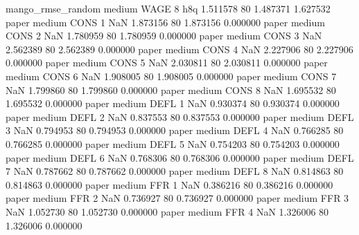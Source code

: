 mango_rmse_random     medium     WAGE                 8                  h8q  1.511578 80       1.487371           1.627532
            paper     medium     CONS                 1                  NaN  1.873156 80       1.873156           0.000000
            paper     medium     CONS                 2                  NaN  1.780959 80       1.780959           0.000000
            paper     medium     CONS                 3                  NaN  2.562389 80       2.562389           0.000000
            paper     medium     CONS                 4                  NaN  2.227906 80       2.227906           0.000000
            paper     medium     CONS                 5                  NaN  2.030811 80       2.030811           0.000000
            paper     medium     CONS                 6                  NaN  1.908005 80       1.908005           0.000000
            paper     medium     CONS                 7                  NaN  1.799860 80       1.799860           0.000000
            paper     medium     CONS                 8                  NaN  1.695532 80       1.695532           0.000000
            paper     medium     DEFL                 1                  NaN  0.930374 80       0.930374           0.000000
            paper     medium     DEFL                 2                  NaN  0.837553 80       0.837553           0.000000
            paper     medium     DEFL                 3                  NaN  0.794953 80       0.794953           0.000000
            paper     medium     DEFL                 4                  NaN  0.766285 80       0.766285           0.000000
            paper     medium     DEFL                 5                  NaN  0.754203 80       0.754203           0.000000
            paper     medium     DEFL                 6                  NaN  0.768306 80       0.768306           0.000000
            paper     medium     DEFL                 7                  NaN  0.787662 80       0.787662           0.000000
            paper     medium     DEFL                 8                  NaN  0.814863 80       0.814863           0.000000
            paper     medium      FFR                 1                  NaN  0.386216 80       0.386216           0.000000
            paper     medium      FFR                 2                  NaN  0.736927 80       0.736927           0.000000
            paper     medium      FFR                 3                  NaN  1.052730 80       1.052730           0.000000
            paper     medium      FFR                 4                  NaN  1.326006 80       1.326006           0.000000

